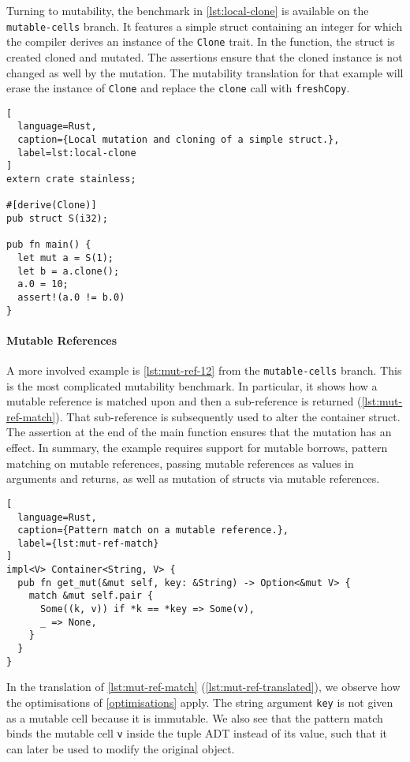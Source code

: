 Turning to mutability, the benchmark in \autoref{lst:local-clone} is available
on the \texttt{mutable-cells} branch. It features a simple struct containing an
integer for which the compiler derives an instance of the \lstinline!Clone!
trait. In the function, the struct is created cloned and mutated. The assertions
ensure that  the cloned instance is not changed as well by the mutation. The
mutability translation for that example will erase the instance of
\lstinline!Clone! and replace the \lstinline!clone! call with
\lstinline!freshCopy!.

\begin{lstlisting}[
  language=Rust,
  caption={Local mutation and cloning of a simple struct.},
  label=lst:local-clone
]
extern crate stainless;

#[derive(Clone)]
pub struct S(i32);

pub fn main() {
  let mut a = S(1);
  let b = a.clone();
  a.0 = 10;
  assert!(a.0 != b.0)
}
\end{lstlisting}


\paragraph{Mutable References}

A more involved example is \autoref{lst:mut-ref-12} from the
\texttt{mutable-cells} branch. This is the most complicated mutability
benchmark. In particular, it shows how a mutable reference is matched upon and
then a sub-reference is returned (\autoref{lst:mut-ref-match}). That
sub-reference is subsequently used to alter the container struct. The assertion
at the end of the main function ensures that the mutation has an effect. In
summary, the example requires support for mutable borrows, pattern matching on
mutable references, passing mutable references as values in arguments and
returns, as well as mutation of structs via mutable references.

\begin{lstlisting}[
  language=Rust,
  caption={Pattern match on a mutable reference.},
  label={lst:mut-ref-match}
]
impl<V> Container<String, V> {
  pub fn get_mut(&mut self, key: &String) -> Option<&mut V> {
    match &mut self.pair {
      Some((k, v)) if *k == *key => Some(v),
      _ => None,
    }
  }
}
\end{lstlisting}

In the translation of \autoref{lst:mut-ref-match}
(\autoref{lst:mut-ref-translated}), we observe how the optimisations of
\autoref{optimisations} apply. The string argument \lstinline!key! is not given
as a mutable cell because it is immutable. We also see that the pattern match
binds the mutable cell \lstinline!v! inside the tuple ADT instead of its value,
such that it can later be used to modify the original object.

